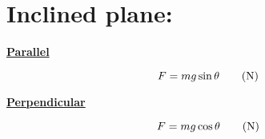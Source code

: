 \documentclass[11pt]{article}
\begin{document}
 \section{Inclined plane: }
		\begin{multicols}{2}
		\begin{center}
			\underline{\textbf{Parallel}}
		\end{center}
		\begin{equation}
		F=mg\sin\theta\tag{\si{\newton}}
		\end{equation}
		\begin{center}
			\underline{\textbf{Perpendicular}}
		\end{center}
		\begin{equation}
		F=mg\cos\theta\tag{\si{\newton}}
		\end{equation}
		
\end{multicols}
\end{document}

